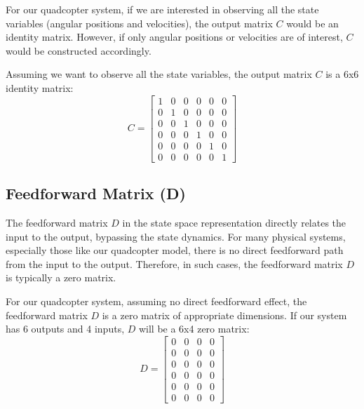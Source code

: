 \documentclass[12pt]{article}
\begin{document}
For our quadcopter system, if we are interested in observing all the state variables (angular positions and velocities), the output matrix \( C \) would be an identity matrix. However, if only angular positions or velocities are of interest, \( C \) would be constructed accordingly.\newline

Assuming we want to observe all the state variables, the output matrix \( C \) is a 6x6 identity matrix:
\begin{equation*}
    C = \begin{bmatrix}
    1 & 0 & 0 & 0 & 0 & 0 \\
    0 & 1 & 0 & 0 & 0 & 0 \\
    0 & 0 & 1 & 0 & 0 & 0 \\
    0 & 0 & 0 & 1 & 0 & 0 \\
    0 & 0 & 0 & 0 & 1 & 0 \\
    0 & 0 & 0 & 0 & 0 & 1
    \end{bmatrix}
\end{equation*}

\subsection{Feedforward Matrix (D)}
The feedforward matrix \( D \) in the state space representation directly relates the input to the output, bypassing the state dynamics. For many physical systems, especially those like our quadcopter model, there is no direct feedforward path from the input to the output. Therefore, in such cases, the feedforward matrix \( D \) is typically a zero matrix.\newline

For our quadcopter system, assuming no direct feedforward effect, the feedforward matrix \( D \) is a zero matrix of appropriate dimensions. If our system has 6 outputs and 4 inputs, \( D \) will be a 6x4 zero matrix:
\begin{equation*}
    D = \begin{bmatrix}
    0 & 0 & 0 & 0 \\
    0 & 0 & 0 & 0 \\
    0 & 0 & 0 & 0 \\
    0 & 0 & 0 & 0 \\
    0 & 0 & 0 & 0 \\
    0 & 0 & 0 & 0
    \end{bmatrix}
\end{equation*}


\end{document}

